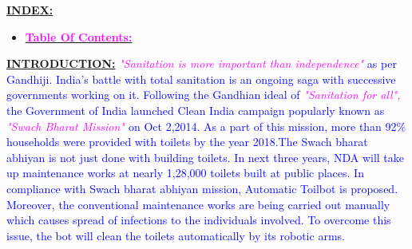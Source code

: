 \documentclass{beamer}
\begin{document}
\begin{frame}
{\underline{\textbf{INDEX:}}}

\begin{itemize}
\item \underline{\textbf{\textcolor{magenta}{Table Of Contents:}}}
\begin{enumerate}
\end{enumerate}
\end{itemize}
\end{frame}


\begin{frame}{\underline{\textbf{INTRODUCTION:}}}
\textit{\textcolor{magenta}{"Sanitation is more important than independence"}}\textcolor{blue}{ as per Gandhiji. India's battle with total sanitation is an ongoing saga with successive governments working on it. Following the Gandhian ideal of }\textit{\textcolor{magenta}{ "Sanitation for all", }}\textcolor{blue}{the Government of India launched Clean India campaign popularly known as} \textit{\textcolor{magenta}{"Swach Bharat Mission" }}\textcolor{blue}{on Oct 2,2014. As a part of this mission, more than 92\% households were provided with toilets by the year 2018.The Swach bharat abhiyan is not just done with building toilets.  In next three years, NDA will take up maintenance works at nearly 1,28,000 toilets built at public places. In compliance with Swach bharat abhiyan mission,  Automatic Toilbot is proposed. Moreover, the conventional maintenance works are being carried out manually which causes spread of infections to the individuals involved. To overcome this issue, the bot will clean the toilets  automatically by its robotic arms.}
\end{frame}
\end{document}
